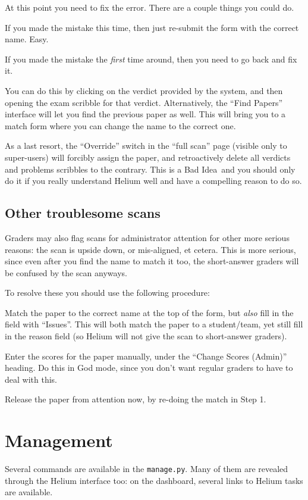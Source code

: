 At this point you need to fix the error.
There are a couple things you could do.
\begin{itemize}
	\ii If you made the mistake this time,
	then just re-submit the form with the correct name. Easy.

	\ii If you made the mistake the \emph{first} time around,
	then you need to go back and fix it.

	You can do this by clicking on the verdict provided by the system,
	and then opening the exam scribble for that verdict.
	Alternatively, the ``Find Papers'' interface will let you find
	the previous paper as well.
	This will bring you to a match form where you can change the
	name to the correct one.

	\ii As a last resort,
	the ``Override'' switch in the ``full scan'' page (visible only to super-users)
	will forcibly assign the paper,
	and retroactively delete all verdicts and
	problems scribbles to the contrary.
	This is a Bad Idea\texttrademark\ and you should only do it
	if you really understand Helium well and have a compelling reason to do so.
\end{itemize}

\subsection{Other troublesome scans}
\label{sec:trouble_scan}
Graders may also flag scans for administrator attention for other 
more serious reasons:
the scan is upside down, or mis-aligned, et cetera.
This is more serious, since even after you find the name to match it too,
the short-answer graders will be confused by the scan anyways.

To resolve these you should use the following procedure:
\begin{enumerate}
	\ii Match the paper to the correct name at the top of the form,
	but \emph{also} fill in the field with ``Issues''.
	This will both match the paper to a student/team,
	yet still fill in the reason field
	(so Helium will not give the scan to short-answer graders).

	\ii Enter the scores for the paper manually,
	under the ``Change Scores (Admin)'' heading.
	Do this in God mode,
	since you don't want regular graders to have to deal with this.
	
	\ii Release the paper from attention now,
	by re-doing the match in Step 1.
\end{enumerate}

\section{Management}
Several commands are available in the \texttt{manage.py}.
Many of them are revealed through the Helium interface too:
on the dashboard, several links to Helium tasks are available.

